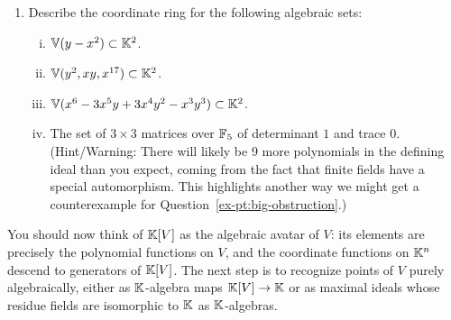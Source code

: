 \documentclass[12pt,reqno]{amsart}
\begin{document}
\begin{enumerate}[leftmargin=*]
\begin{enumerate}[label=(\alph*),ref=\theenumi\alph*]
	\item Describe the coordinate ring for the following algebraic sets:
	\begin{enumerate}[(i)]
		\item $\mathbb{V}(y-x^2) \subset \mathbb{K}^2$.
		\item $\mathbb{V}(y^2, xy, x^{17}) \subset \mathbb{K}^2$.
		\item $\mathbb{V}(x^6 - 3 x^5 y + 3 x^4 y^2 - x^3 y^3) \subset \mathbb{K}^2$.
		\item The set of $3\times 3$ matrices over $\mathbb{F}_5$ of determinant $1$ and trace $0$. (Hint/Warning: There will likely be 9 more polynomials in the defining ideal than you expect, coming from the fact that finite fields have a special automorphism. This highlights another way we might get a counterexample for Question~\ref{ex-pt:big-obstruction}.)
	\end{enumerate}
 \end{enumerate}
 \end{enumerate}
 
 \hrulefill

You should now think of $\mathbb{K}[V]$ as the algebraic avatar of $V$: its elements are precisely the polynomial functions on $V$, and the coordinate functions on $\mathbb{K}^n$ descend to generators of $\mathbb{K}[V]$. The next step is to recognize points of $V$ purely algebraically, either as $\mathbb{K}$-algebra maps $\mathbb{K}[V]\to \mathbb{K}$ or as maximal ideals whose residue fields are isomorphic to $\mathbb{K}$ as $\mathbb{K}$-algebras.

\hrulefill
\end{document}
